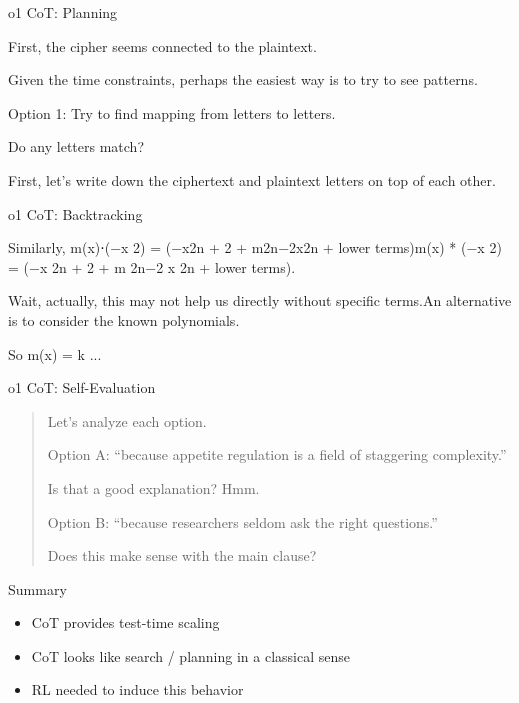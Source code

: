 \documentclass[14pt,aspectratio=169]{beamer}
\begin{document}
\begin{frame}{o1 CoT: Planning}
	\begin{tcolorbox}[colback=white,colframe=black,boxrule=0.5pt]
		First, the cipher seems connected to the plaintext.

		Given the time constraints, perhaps the easiest way is to try to see patterns.

		Option 1: Try to find mapping from letters to letters.

		Do any letters match?

		First, let's write down the ciphertext and plaintext letters on top of each other.
	\end{tcolorbox}
\end{frame}

\begin{frame}{o1 CoT: Backtracking}
	\begin{tcolorbox}[colback=white,colframe=black,boxrule=0.5pt]

		Similarly, m(x)⋅(−x 2) = (−x2n + 2 + m2n−2x2n + lower terms)m(x) * (−x 2) = (−x 2n + 2 + m 2n−2 x 2n + lower terms).

		Wait, actually, this may not help us directly without specific terms.An alternative is to consider the known polynomials.

		So m(x) = k ...
	\end{tcolorbox}
\end{frame}

\begin{frame}{o1 CoT: Self-Evaluation}

	\begin{tcolorbox}[colback=white,colframe=black,boxrule=0.5pt]
		\begin{quote}

			Let’s analyze each option.

			Option A: “because appetite regulation is a field of staggering complexity.”

			Is that a good explanation? Hmm.

			Option B: “because researchers seldom ask the right questions.”

			Does this make sense with the main clause?
		\end{quote}
	\end{tcolorbox}
\end{frame}

\begin{frame}{Summary}
	\begin{itemize}
		\item CoT provides test-time scaling
		\item CoT looks like search / planning in a classical sense
		\item RL needed to induce this behavior
	\end{itemize}
\end{frame}
\end{document}
